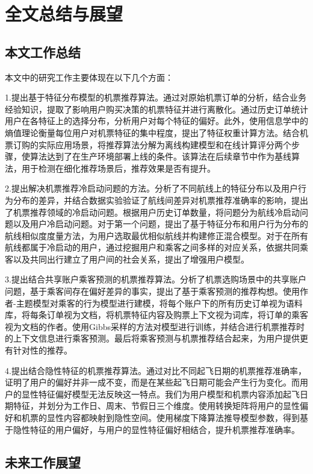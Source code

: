 
\chapter{全文总结与展望}
\label{chap:summary}

\section{本文工作总结}
本文中的研究工作主要体现在以下几个方面：

1.提出基于特征分布模型的机票推荐算法。通过对原始机票订单的分析，结合业务经验知识，提取了影响用户购买决策的机票特征并进行离散化。通过历史订单统计用户在各特征上的选择分布，分析用户对每个特征的偏好。此外，使用信息学中的熵值理论衡量每位用户对机票特征的集中程度，提出了特征权重计算方法。结合机票订购的实际应用场景，将推荐算法分解为离线构建模型和在线计算评分两个步骤，使算法达到了在生产环境部署上线的条件。该算法在后续章节中作为基线算法，用于检测在细化推荐场景后，推荐效果是否有提升。

2.提出解决机票推荐冷启动问题的方法。分析了不同航线上的特征分布以及用户行为分布的差异，并结合数据实验验证了航线间差异对机票推荐准确率的影响，提出了机票推荐领域的冷启动问题。根据用户历史订单数量，将问题分为航线冷启动问题以及用户冷启动问题。对于第一个问题，提出了基于特征分布和用户行为分布的航线相似度度量方法，为用户选取最优相似航线并构建修正混合模型。对于在所有航线都属于冷启动的用户，通过挖掘用户和乘客之间多样的对应关系，依据共同乘客以及共同出行建立了用户间的社会关系，提出了增强用户模型。

3.提出结合共享账户乘客预测的机票推荐算法。分析了机票选购场景中的共享账户问题，基于乘客间存在偏好差异的事实，提出了基于乘客预测的推荐构想。使用作者-主题模型对乘客的行为模型进行建模，将每个账户下的所有历史订单视为语料库，将每条订单视为文档，将机票特征内容及购票上下文视为词库，将订单的乘客视为文档的作者。使用Gibbs采样的方法对模型进行训练，并结合进行机票推荐时的上下文信息进行乘客预测。最后将乘客预测与机票推荐结合起来，为用户提供更有针对性的推荐。

4.提出结合隐性特征的机票推荐算法。通过对比不同起飞日期的机票推荐准确率，证明了用户的偏好并非一成不变，而是在某些起飞日期可能会产生行为变化。而用户的显性特征偏好模型无法反映这一特点。我们为用户模型和机票内容添加起飞日期特征，并划分为工作日、周末、节假日三个维度。使用转换矩阵将用户的显性偏好和机票的显性内容都映射到隐性空间。使用梯度下降算法推导模型参数，得到基于隐性特征的用户偏好，与用户的显性特征偏好相结合，提升机票推荐准确率。

\section{未来工作展望}

